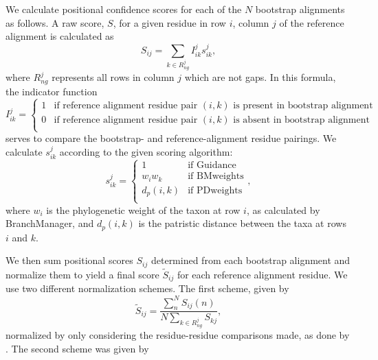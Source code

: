 \documentclass[10pt]{article}
\begin{document}
We calculate positional confidence scores for each of the $N$ bootstrap alignments as follows. A raw score, $S$, for a given residue in row $i$, column $j$ of the reference alignment is calculated as \begin{equation} S_{ij} = \sum\limits_{k \in R_{ng}^j} I_{ik}^j s_{ik}^j    ,\end{equation} where $R_{ng}^j$ represents all rows in column $j$ which are not gaps.
In this formula, the indicator function 
\begin{equation}I_{ik}^j = \left\{ \begin{array}{rl}

              1                         &\mbox{if reference alignment residue pair $(i, k)$ is present in bootstrap alignment} \\
              0            &\mbox{if reference alignment residue pair $(i, k)$ is absent in bootstrap alignment} \\
                     \end{array} \right. 
\end{equation}
serves to compare the bootstrap- and reference-alignment residue pairings.
We calculate $s_{ik}^j$ according to the given scoring algorithm:
\begin{equation}
s_{ik}^j = \left\{ \begin{array}{rl}

              1                         &\mbox{if Guidance} \\
              w_iw_k              &\mbox{if BMweights} \\
              d_p(i,k)              &\mbox{if PDweights} \\
                     \end{array} \right.,
\end{equation} where $w_i$ is the phylogenetic weight of the taxon at row $i$, as calculated by BranchManager, and $d_p(i, k)$ is the patristic distance between the taxa at rows $i$ and $k$. 

We then sum positional scores $S_{ij}$ determined from each bootstrap alignment and normalize them to yield a final score $\widetilde{S}_{ij}$ for each reference alignment residue. We use two different normalization schemes. The first scheme, given by \begin{equation} \widetilde{S}_{ij} = \frac{\sum_{n}^N S_{ij}(n)}{N\sum_{k \in R_{ng}^j} S_{kj}}, \end{equation} normalized by only considering the residue-residue comparisons made, as done by \citep{Penn2010}. The second scheme was given by 
\end{document}
